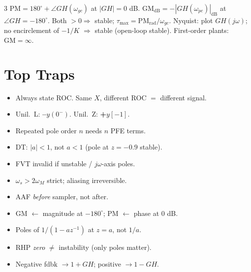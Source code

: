 \documentclass[9pt,landscape]{extarticle}
\begin{document}
\begin{multicols*}{3}
$\mathrm{PM}=180^\circ+\angle GH(\omega_{gc})$ at $|GH|=0$ dB.
$\mathrm{GM}_\mathrm{dB}=-|GH(\omega_{pc})|_\mathrm{dB}$ at $\angle GH=-180^\circ$.
Both $>0 \Rightarrow$ stable; $\tau_{\max}=\mathrm{PM}_\mathrm{rad}/\omega_{gc}$.
Nyquist: plot $GH(j\omega)$; no encirclement of $-1/K$ $\Rightarrow$ stable (open-loop stable).
First-order plants: $\mathrm{GM}=\infty$.

\section*{Top Traps}
\begin{itemize}
\item Always state ROC. Same $X$, different ROC $=$ different signal.
\item Unil.\ L: \textbf{--}$y(0^-)$. Unil.\ Z: \textbf{+}$y[-1]$.
\item Repeated pole order $n$ needs $n$ PFE terms.
\item DT: $|a|<1$, not $a<1$ (pole at $z=-0.9$ stable).
\item FVT invalid if unstable / $j\omega$-axis poles.
\item $\omega_s>2\omega_M$ strict; aliasing irreversible.
\item AAF \emph{before} sampler, not after.
\item GM $\leftarrow$ magnitude at $-180^\circ$; PM $\leftarrow$ phase at 0 dB.
\item Poles of $1/(1-az^{-1})$ at $z=a$, not $1/a$.
\item RHP \emph{zero} $\ne$ instability (only poles matter).
\item Negative fdbk $\to 1+GH$; positive $\to 1-GH$.
\end{itemize}

\end{multicols*}
\end{document}
